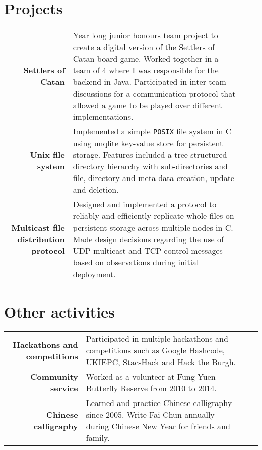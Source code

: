 \documentclass{article}
\newcommand{\n}[0]{\\[\baselineskip]}
\begin{document}
\section*{Projects}
\begin{tabular}{R|p{14cm}}
\textbf{Settlers of Catan} & Year long junior honours team project to create a digital version of the Settlers of Catan board game. Worked together in a team of 4 where I was responsible for the backend in Java. Participated in inter-team discussions for a communication protocol that allowed a game to be played over different implementations. \n

\textbf{Unix file system} & Implemented a simple \texttt{POSIX} file system in C using unqlite key-value store for persistent storage. Features included a tree-structured directory hierarchy with sub-directories and file, directory and meta-data creation, update and deletion.\n

\textbf{Multicast file distribution protocol} & Designed and implemented a protocol to reliably and efficiently replicate whole files on persistent storage across multiple nodes in C. Made design decisions regarding the use of UDP multicast and TCP control messages based on observations during initial deployment.\\
\end{tabular}

\section*{Other activities}
\begin{tabular}{R|p{14cm}}
\textbf{Hackathons and competitions} & Participated in multiple hackathons and competitions such as Google Hashcode, UKIEPC, StacsHack and Hack the Burgh. \n

\textbf{Community service} & Worked as a volunteer at Fung Yuen Butterfly Reserve from 2010 to 2014. \n

\textbf{Chinese calligraphy} & Learned and practice Chinese calligraphy since 2005. Write Fai Chun annually during Chinese New Year for friends and family. 
\end{tabular}
\end{document}

